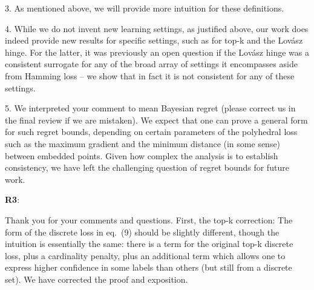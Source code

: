 \documentclass{article}
\newcommand{\Comments}{1}
\newcommand{\mynote}[2]{\ifnum\Comments=1\textcolor{#1}{#2}\fi}
\newcommand{\jessie}[1]{\mynote{purple}{[JF: #1]}}
\begin{document}
3. As mentioned above, we will provide more intuition for these definitions.

4. While we do not invent new learning settings, as justified above, our work does indeed provide new results for specific settings, such as for top-k and the Lov\'asz hinge.  For the latter, it was previously an open question if the Lov\'asz hinge was a consistent surrogate for any of the broad array of settings it encompasses aside from Hamming loss -- we show that in fact it is not consistent for any of these settings.

5. We interpreted your comment to mean Bayesian regret (please correct us in the final review if we are mistaken).
We expect that one can prove a general form for such regret bounds, depending on certain parameters of the polyhedral loss such as the maximum gradient and the minimum distance (in some sense) between embedded points.
Given how complex the analysis is to establish consistency, we have left the challenging question of regret bounds for future work.

\textbf{R3}:

Thank you for your comments and questions.
First, the top-k correction: The form of the discrete loss in eq.~(9) should be slightly different, though the intuition is essentially the same: there is a term for the original top-k discrete loss, plus a cardinality penalty, plus an additional term which allows one to express higher confidence in some labels than others (but still from a discrete set).
We have corrected the proof and exposition.
\end{document}
